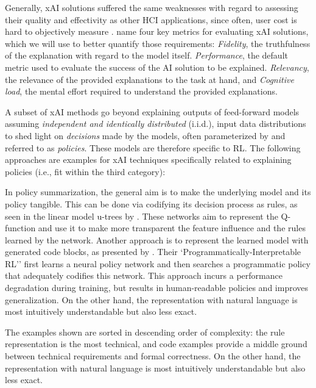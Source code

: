 \documentclass[twoside,11pt]{article}
\begin{document}
Generally, xAI solutions suffered the same weaknesses with regard to assessing their quality and effectivity as other HCI applications, since often, user cost is hard to objectively measure \citep{bruneau2002eyes}. \cite{milani2022survey} name four key metrics for evaluating xAI solutions, which we will use to better quantify those requirements: \emph{Fidelity}, the truthfulness of the explanation with regard to the model itself. \emph{Performance}, the default metric used to evaluate the success of the AI solution to be explained. \emph{Relevancy}, the relevance of the provided explanations to the task at hand, and \emph{Cognitive load}, the mental effort required to understand the provided explanations. 

A subset of xAI methods go beyond explaining outputs of feed-forward models assuming \emph{independent and identically distributed} (i.i.d.), input data distributions to shed light on \emph{decisions} made by the models, often parameterized by and referred to as \emph{policies}. These models are therefore specific to RL. The following approaches are examples for xAI techniques specifically related to explaining policies (i.e., fit within the third category): 

In policy summarization, the general aim is to make the underlying model and its policy tangible. This can be done via codifying its decision process as rules, as seen in the linear model u-trees by \citet{LiuEtAl:2018:LinearModelUTrees}. These networks aim to represent the Q-function and use it to make more transparent the feature influence and the rules learned by the network. 
Another approach is to represent the learned model with generated code blocks, as presented by \citet{VermaEtAl:2018:ProgrammaticallyInterpretableRL}. Their `Programmatically-Interpretable RL'' first learns a neural policy network and then searches a programmatic policy that adequately codifies this network. This approach incurs a performance degradation during training, but results in human-readable policies and improves generalization. On the other hand, the representation with natural language is most intuitively understandable but also less exact.

The examples shown are sorted in descending order of complexity: the rule representation is the most technical, and code examples provide a middle ground between technical requirements and formal correctness. On the other hand, the representation with natural language is most intuitively understandable but also less exact.
\end{document}
